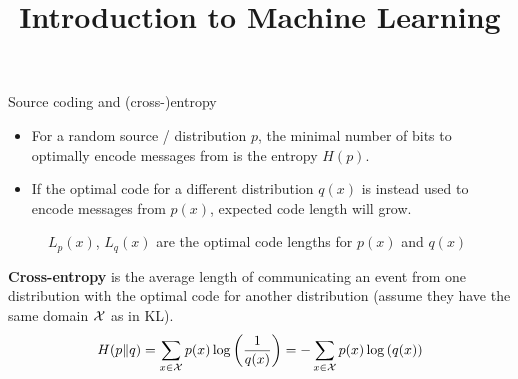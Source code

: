 \documentclass[11pt,compress,t,notes=noshow, xcolor=table]{beamer}
\title{Introduction to Machine Learning}
\date{}
\begin{document}



\begin{vbframe} {Source coding and (cross-)entropy}

\begin{itemize}
  \item For a random source / distribution $p$, the minimal number of bits to optimally encode messages from is the entropy $H(p)$.
  \item If the optimal code for a different distribution $q(x)$ is instead used to encode messages from $p(x)$, expected code length will grow.
\end{itemize}
  \vspace{-0.3cm}
  \begin{figure}
    \centering
      \caption{\footnotesize{$L_p(x)$, $L_q(x)$ are the optimal code lengths for $p(x)$ and $q(x)$}}
  \end{figure}

\framebreak
\textbf{Cross-entropy} is the average length of communicating an event from one distribution with the optimal code for another distribution (assume they have the same domain $\mathcal{X}$ as in KL).
  $$ H(p \| q) = \sum_{x \in \mathcal{X}} p(x) \log\left(\frac{1}{q(x)}\right) = - \sum_{x \in \mathcal{X}} p(x) \log\left(q(x)\right) $$


\end{vbframe}
\end{document}
